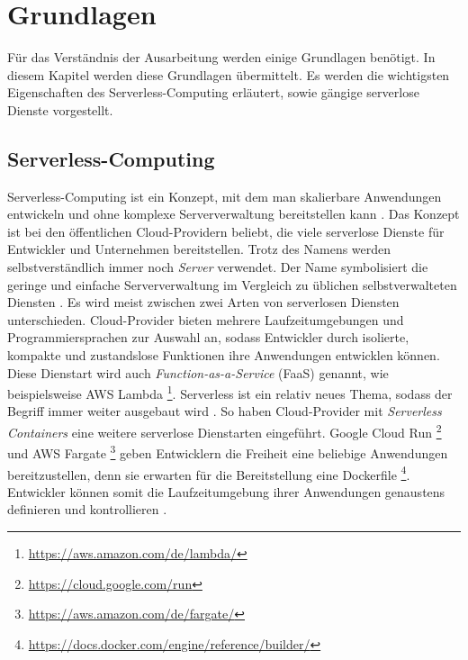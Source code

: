 \chapter{Grundlagen}
Für das Verständnis der Ausarbeitung werden einige Grundlagen benötigt.
In diesem Kapitel werden diese Grundlagen übermittelt.
Es werden die wichtigsten Eigenschaften des Serverless-Computing erläutert,
sowie gängige serverlose Dienste vorgestellt.

\section{Serverless-Computing}
Serverless-Computing ist ein Konzept, mit dem man skalierbare Anwendungen
entwickeln und ohne komplexe Serververwaltung bereitstellen kann \cite{CioGov}.
Das Konzept ist bei den öffentlichen Cloud-Providern beliebt, die viele
serverlose Dienste für Entwickler und Unternehmen bereitstellen. Trotz des Namens
werden selbstverständlich immer noch \textit{Server} verwendet. Der Name symbolisiert die geringe
und einfache Serververwaltung im Vergleich zu üblichen selbstverwalteten
Diensten \cite{CNCF}. Es wird meist zwischen zwei Arten von
serverlosen Diensten unterschieden. Cloud-Provider bieten mehrere
Laufzeitumgebungen und Programmiersprachen zur Auswahl an,
sodass Entwickler durch isolierte, kompakte und zustandslose Funktionen
ihre Anwendungen entwicklen können. Diese Dienstart wird auch
\textit{Function-as-a-Service} (FaaS) genannt, wie beispielsweise
AWS Lambda \footnote{\url{https://aws.amazon.com/de/lambda/}}.
Serverless ist ein relativ neues Thema, sodass
der Begriff immer weiter ausgebaut wird \cite{ServerlessTrends}.
So haben Cloud-Provider mit \textit{Serverless Containers}
eine weitere serverlose Dienstarten eingeführt. Google Cloud Run
\footnote{\url{https://cloud.google.com/run}} und AWS Fargate
\footnote{\url{https://aws.amazon.com/de/fargate/}} geben Entwicklern
die Freiheit eine beliebige Anwendungen bereitzustellen,
denn sie erwarten für die Bereitstellung eine Dockerfile
\footnote{\url{https://docs.docker.com/engine/reference/builder/}}.
Entwickler können somit die Laufzeitumgebung ihrer Anwendungen
genaustens definieren und kontrollieren \cite{ServerlessTrends}.

